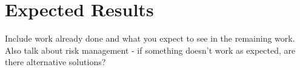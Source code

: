 \documentclass[11pt,notitlepage]{article}
\begin{document}

\section{Expected Results}

Include work already done and what you expect to see in the
remaining work. Also talk about risk management - if something
doesn't work as expected, are there alternative solutions?




\end{document}
